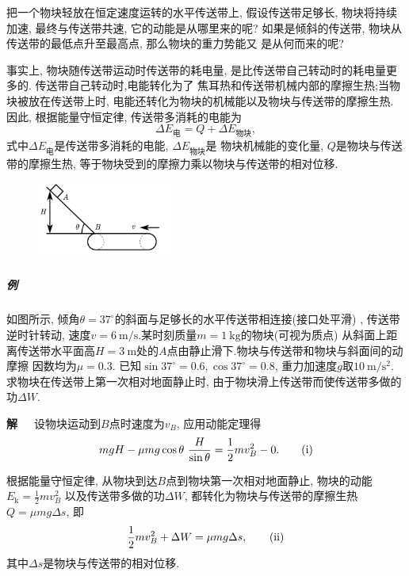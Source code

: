 \documentclass[11pt,a4paper]{ctexart}
\newcounter{exam}[section]
\begin{document}
把一个物块轻放在恒定速度运转的水平传送带上, 假设传送带足够长, 物块将持续加速, 最终与传送带共速,
它的动能是从哪里来的呢? 如果是倾斜的传送带, 物块从传送带的最低点升至最高点, 那么物块的重力势能又
是从何而来的呢?

事实上, 物块随传送带运动时传送带的耗电量, 是比传送带自己转动时的耗电量更多的. 传送带自己转动时,电能转化为了
焦耳热和传送带机械内部的摩擦生热;当物块被放在传送带上时, 电能还转化为物块的机械能以及物块与传送带的摩擦生热.
因此, 根据能量守恒定律, 传送带多消耗的电能为
$$\Delta E_\text{电} = Q + \Delta E_\text{物块},$$
式中$\Delta E_\text{电}$是传送带多消耗的电能, $\Delta E_\text{物块}$是
物块机械能的变化量, $Q$是物块与传送带的摩擦生热, 等于物块受到的摩擦力乘以物块与传送带的相对位移.


\begin{figure}
	\flushright
	\includegraphics[width=0.4\textwidth]{pic/exam_5-3.pdf}
	\label{fic14}
\end{figure}
\subparagraph{例\theexam} 如图所示, 倾角$\theta = 37^{\circ}$的斜面与足够长的水平传送带相连接(接口处平滑)
, 传送带逆时针转动, 速度$v = 6\ \mathrm{m/s}$.某时刻质量$m = 1\ \mathrm{kg}$的物块(可视为质点)
从斜面上距离传送带水平面高$H = 3\ \mathrm{m}$处的$A$点由静止滑下.物块与传送带和物块与斜面间的动摩擦
因数均为$\mu = 0.3$. 已知$\sin 37^{\circ} = 0.6, \cos 37^{\circ} = 0.8$, 重力加速度$g$取$10\ \mathrm{m/s^2}$.
求物块在传送带上第一次相对地面静止时, 由于物块滑上传送带而使传送带多做的功$\Delta W$.

\textbf{解}\ \ \ 设物块运动到$B$点时速度为$v_B$, 应用动能定理得
\begin{equation*}
	mgH - \mu mg\cos \theta \ \frac{H}{\sin \theta} = \frac12 mv^2_B-0.
	\tag{i}
	\setlength{\abovedisplayskip}{5pt}
	\setlength{\belowdisplayskip}{10pt}
\end{equation*}

根据能量守恒定律, 从物块到达$B$点到物块第一次相对地面静止, 物块的动能$E_\mathrm{k} = \displaystyle\frac12 m v_B^2$
以及传送带多做的功$\Delta W$,
都转化为物块与传送带的摩擦生热$Q = \mu mg\Delta s$, 即
\begin{equation*}
	\frac12 m v_B^2 + \Delta W = \mu mg \Delta s,
	\setlength{\abovedisplayskip}{5pt}
	\setlength{\belowdisplayskip}{5pt}
	\tag{ii}
\end{equation*}
其中$\Delta s$是物块与传送带的相对位移.
\end{document}
